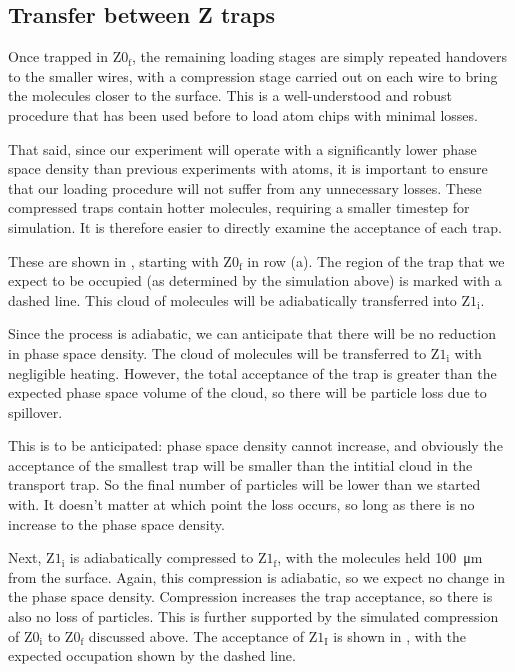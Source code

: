 \subsection{Transfer between Z traps}
\label{design:transferbetweenzs}

Once trapped in $\mathrm{Z0_f}$, the remaining loading stages are simply
repeated handovers to the smaller wires, with a compression stage carried out
on each wire to bring the molecules closer to the surface. This is a
well-understood and robust procedure that has been used before to load atom
chips with minimal losses.~\cite{Reichel2002}

That said, since our experiment will operate with a significantly lower phase
space density than previous experiments with atoms, it is important to ensure
that our loading procedure will not suffer from any unnecessary losses. These
compressed traps contain hotter molecules, requiring a smaller timestep for
simulation. It is therefore easier to directly examine the acceptance of each
trap.

These are shown in , starting with
$\mathrm{Z0_f}$ in row (a). The region of the trap that we expect to be
occupied (as determined by the simulation above) is marked with a dashed line.
This cloud of molecules will be adiabatically transferred into $\mathrm{Z1_i}$.

Since the process is adiabatic, we can anticipate that there will be no
reduction in phase space density. The cloud of molecules will be transferred to
$\mathrm{Z1_i}$ with negligible heating. However, the total acceptance of the
trap is greater than the expected phase space volume of the cloud, so there
will be particle loss due to spillover.

This is to be anticipated: phase space density cannot increase, and obviously
the acceptance of the smallest trap will be smaller than the intitial cloud in
the transport trap. So the final number of particles will be lower than we
started with. It doesn't matter at which point the loss occurs, so long as
there is no increase to the phase space density.

Next, $\mathrm{Z1_i}$ is adiabatically compressed to $\mathrm{Z1_f}$, with the
molecules held \SI{100}{\micro\meter} from the surface. Again, this
compression is adiabatic, so we expect no change in the phase space density.
Compression increases the trap acceptance, so there is also no loss of
particles. This is further supported by the simulated compression of
$\mathrm{Z0_i}$ to $\mathrm{Z0_f}$ discussed above. The acceptance of
$\mathrm{Z1_I}$ is shown in , with
the expected occupation shown by the dashed line.


